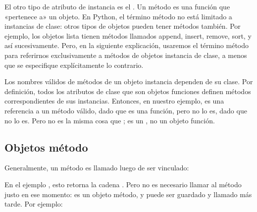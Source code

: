 \documentclass[a5paper,10pt,spanish]{sphinxmanual}
\begin{document}
\sphinxAtStartPar
El otro tipo de atributo de instancia es el .  Un método es una función que «pertenece a» un objeto.  En Python, el término método no está limitado a instancias de clase: otros tipos de objetos pueden tener métodos también.  Por ejemplo, los objetos lista tienen métodos llamados append, insert, remove, sort, y así sucesivamente.  Pero, en la siguiente explicación, usaremos el término método para referirnos exclusivamente a métodos de objetos instancia de clase, a menos que se especifique explícitamente lo contrario.

\ignorespaces 
\sphinxAtStartPar
Los nombres válidos de métodos de un objeto instancia dependen de su clase. Por definición, todos los atributos de clase que son objetos funciones definen métodos correspondientes de sus instancias.  Entonces, en nuestro ejemplo,  es una referencia a un método válido, dado que  es una función, pero  no lo es, dado que  no lo es.  Pero  no es la misma cosa que ; es un , no un objeto función.


\subsection{Objetos método}
\label{\detokenize{tutorial/classes:method-objects}}\label{\detokenize{tutorial/classes:tut-methodobjects}}
\sphinxAtStartPar
Generalmente, un método es llamado luego de ser vinculado:

\begin{sphinxVerbatim}[commandchars=\\\{\}]
\end{sphinxVerbatim}

\sphinxAtStartPar
En el ejemplo , esto retorna la cadena . Pero no es necesario llamar al método justo en ese momento:  es un objeto método, y puede ser guardado y llamado más tarde.  Por ejemplo:

\begin{sphinxVerbatim}[commandchars=\\\{\}]
  
 
\end{sphinxVerbatim}
\end{document}
